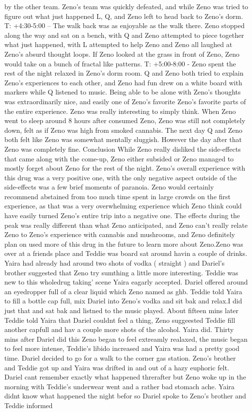 \documentclass[12pt]{book}
\begin{document}
by the other team. Zeno's team was quickly defeated, and while Zeno was tried to figure out what just happened L, Q, and Zeno left to head back to Zeno's dorm. T: +4:30-5:00 -- The walk back was as enjoyable as the walk there. Zeno stopped along the way and sat on a bench, with Q and Zeno attempted to piece together what just happened, with L attempted to help Zeno and Zeno all laughed at Zeno's absurd thought loops. If Zeno looked at the grass in front of Zeno, Zeno would take on a bunch of fractal like patterns. T: +5:00-8:00 - Zeno spent the rest of the night relaxed in Zeno's dorm room. Q and Zeno both tried to explain Zeno's experiences to each other, and Zeno had fun drew on a white board with markers while Q listened to music. Being able to be alone with Zeno's thoughts was extraordinarily nice, and easily one of Zeno's favorite Zeno's favorite parts of the entire experience. Zeno was really interesting to simply think. When Zeno went to sleep around 8 hours after consumed Zeno, Zeno was still not completely down, felt as if Zeno was high from smoked cannabis. The next day Q and Zeno both felt like Zeno was somewhat mentally sluggish. However the day after that Zeno was completely fine. Conclusion While Zeno really disliked the side-effects that came along with the come-up, Zeno either subsided or Zeno managed to mostly forget about Zeno for the rest of the night. Zeno's overall experience with this drug was a very positive one, with the only negative aspect outside of the side-effects was a few brief moments of paranoia. Zeno would certainly recommend abstained from too much time spent in large crowds on the first experience, as that was a very overwhelming experience which Zeno think could have easily turned Zeno's entire trip into a negative one. The effects during the peak was really different than what Zeno anticipated, and Zeno can't really relate Zeno to Zeno's experience with cannabis and mushrooms, and Zeno definitely plan on used more of this drug in the future to learn more about Zeno.Zeno was over at a friends place and Teddie was board sat around havin a couple of drinks. Yaira had already had around two shots of vodka ( straight ) and Dariel's brother suggested that Zeno try sumthing a little more interesting. Teddie was new to this wholedrug taking' scene Yaira eagarly accepted. Dariel offered around an eyedropper full of a clear liquid which Zeno named as ghb. Teddie told Yaira to fill a bottle cap full, mix Dariel into Zeno's vodka and sit bak and relax.I did just that and sat bak and listned to the music played. About fifteen mins later Teddie told Yaira that Dariel couldnt feel a thing, Zeno suggeested Teddie fill another capfull and hav a couple more shots of the alcohol. Yaira did. Thirty mins after Dariel did this Zeno began to feel extreamly realaxed, the music began to feel more intense, Teddie's libido increased and Yaira was had a pretty good time. Dariel decided to go for a walk to the corner gas station. Zeno's brother and Teddie got up and Yaira was drifted in and out of a hazy euphoric felt. Dariel cant remember exactly what happened threrafter but Zeno woke up in the morning with Teddie's underwear went and a rather bad stomach ache. Yaira didnt know what happened the night befor so Dariel spoke to Zeno's brother and Teddie informed 
\end{document}
